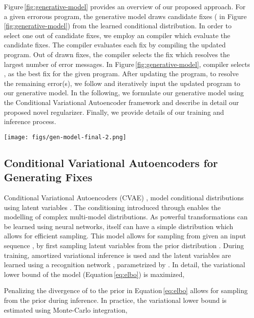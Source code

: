 \documentclass[letterpaper]{article} \usepackage{aaai20}  \usepackage{times}  \usepackage{helvet} \usepackage{courier}  \usepackage[hyphens]{url}  \usepackage{graphicx}
\newcommand{\figref}{Figure}
\newcommand{\equref}{Equation}
\begin{document}
\figref \,\ref{fig:generative-model} provides an overview of our proposed approach. For a given errorous program, the generative model draws  candidate fixes  ( in \figref \,\ref{fig:generative-model}) from the learned conditional distribution. In order to select one out of  candidate fixes, we employ an compiler which evaluate the candidate fixes. The compiler evaluates each fix by compiling the updated program. Out of  drawn fixes, the compiler selects the fix which resolves the largest number of error messages. In \figref \,\ref{fig:generative-model}, compiler selects , as the best fix for the given program. After updating the program, to resolve the remaining error(s), we follow \citeauthor{Gupta2017DeepFixFC} and iteratively input the updated program to our generative model. In the following, we formulate our generative model using the Conditional Variational Autoencoder framework and describe in detail our proposed novel regularizer. Finally, we provide details of our training and inference process.  

\begin{figure*}[h] 
	\centering
	    \centering
		\texttt{[image: figs/gen-model-final-2.png]}
	
	\caption{Overview of SampleFix at inference time, highlighting the generation of diverse fixes.}
	\label{fig:generative-model}
	\vspace{-.1cm}
\end{figure*}

\subsection{Conditional Variational Autoencoders for Generating Fixes}
Conditional Variational Autoencoders (CVAE) \cite{cvae15sohn}, model conditional distributions  using latent variables  . The conditioning introduced through  enables the modelling of complex multi-model distributions. As powerful transformations can be learned using neural networks,  itself can have a simple distribution which allows for efficient sampling. This model allows for sampling from  given an input sequence , by first sampling latent variables  from the prior distribution . During training, amortized variational inference is used and the latent variables  are learned using a recognition network , parametrized by .  In detail, the variational lower bound of the model (\equref \,\ref{eq:elbo}) is maximized,


Penalizing the divergence of  to the prior in \equref \,\ref{eq:elbo} allows for sampling from the prior  during inference. In practice, the variational lower bound is estimated using Monte-Carlo integration,
\end{document}
